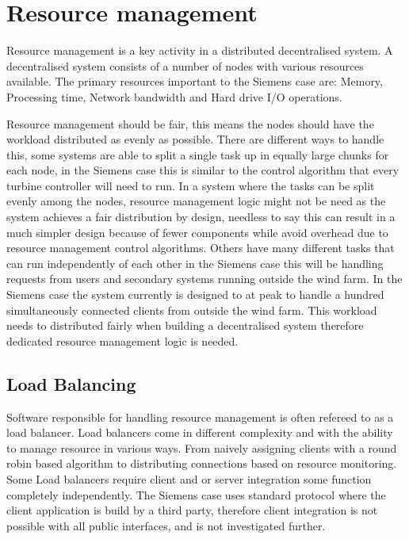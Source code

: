 \section{Resource management} %
\label{cha:resourceManagement}

Resource management is a key activity in a distributed decentralised system.
A decentralised system consists of a number of nodes with various resources available. 
The primary resources important to the Siemens case are: Memory, Processing time, Network bandwidth and Hard drive I/O operations. %

Resource management should be fair, this means the nodes should have the workload distributed as evenly as possible.
There are different ways to handle this, some systems are able to split a single task up in equally large chunks for each node, in the Siemens case this is similar to the control algorithm that every turbine controller will need to run.
In a system where the tasks can be split evenly among the nodes, resource management logic might not be need as the system achieves a fair distribution by design, needless to say this can result in a much simpler design because of fewer components while avoid overhead due to resource management control algorithms. %
Others have many different tasks that can run independently of each other in the Siemens case this will be handling requests from users and secondary systems running outside the wind farm.
In the Siemens case the system currently is designed to at peak to handle a hundred simultaneously connected clients from outside the wind farm. This workload needs to distributed fairly when building a decentralised system therefore dedicated resource management logic is needed.

\subsection{Load Balancing}
Software responsible for handling resource management is often refereed to as a load balancer.
Load balancers come in different complexity and with the ability to manage resource in various ways.
From naively assigning clients with a round robin based algorithm to distributing connections based on resource monitoring.
Some Load balancers require client and or server integration some function completely independently.
The Siemens case uses standard protocol where the client application is build by a third party,
therefore client integration is not possible with all public interfaces, and is not investigated further.

